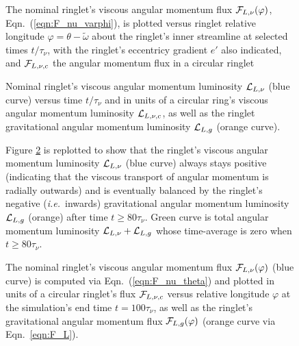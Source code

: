 \documentclass[preprint]{aastex62}
\begin{document}
\begin{figure}
    \caption{
        \label{fig:F_nu_nominal}
        The nominal ringlet's viscous angular momentum flux ${\cal F}_{L,\nu}(\varphi)$,
        Eqn.\ (\ref{eqn:F_nu_varphi}), is plotted versus ringlet
        relative longitude $\varphi=\theta-\tilde{\omega}$ about the ringlet's inner
        streamline at selected times $t/\tau_\nu$, 
        with the ringlet's eccentricy gradient $e'$ also indicated, 
        and ${\cal F}_{L,\nu,c}$ the angular momentum flux in a circular ringlet
    }
\end{figure}

\begin{figure}
    \caption{
        \label{fig:angular_momentum_luminosity_nominal}
        Nominal ringlet's viscous angular momentum luminosity ${\cal L}_{L,\nu}$ (blue curve) versus time $t/\tau_\nu$
        and in units of a circular ring's viscous angular momentum luminosity ${\cal L}_{L,\nu,c}$, 
        as well as the ringlet gravitational angular momentum luminosity ${\cal L}_{L,g}$ (orange curve).
    }
\end{figure}

\begin{figure}
    \caption{
        \label{fig:angular_momentum_luminosity_zoom_nominal}
        Figure \ref{fig:angular_momentum_luminosity_nominal} is replotted to show that the ringlet's 
        viscous angular momentum luminosity ${\cal L}_{L,\nu}$ (blue curve)
        always stays positive (indicating that the viscous transport of angular momentum is radially outwards)
        and is eventually balanced by the ringlet's negative ({\it i.e.}\ inwards) gravitational angular momentum luminosity 
        ${\cal L}_{L,g}$ (orange) after time $t\ge 80\tau_\nu$. Green curve is total angular momentum luminosity 
        ${\cal L}_{L,\nu} + {\cal L}_{L,g}$ whose time-average is zero when $t\ge 80\tau_\nu$.
    }
\end{figure}

\begin{figure}
    \caption{
        \label{fig:F_vs_longitude_nominal}
        The nominal ringlet's viscous angular momentum flux ${\cal F}_{L,\nu}(\varphi)$ (blue curve) is computed
        via Eqn.\ (\ref{eqn:F_nu_theta}) and plotted in units of a circular ringlet's flux ${\cal F}_{L,\nu,c}$
        versus relative longitude $\varphi$ at the simulation's end time $t=100\tau_\nu$, 
        as well as the ringlet's gravitational angular momentum flux ${\cal F}_{L,g}(\varphi)$
        (orange curve via Eqn.\ \ref{eqn:F_L}).
    }
\end{figure}
\end{document}
